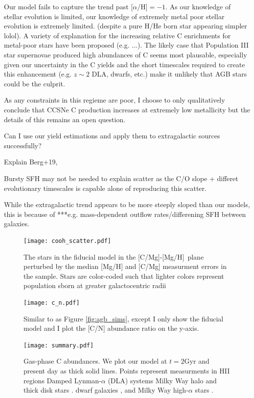\documentclass[12pt,oneside]{report}
\newcommand{\caah}{[C/Mg]-[Mg/H]}
\begin{document}
Our model fails to capture the trend past [$\alpha$/H]$=-1$. As our knowledge
of stellar evolution is limited, our knowledge of extremely metal poor stellar
evolution is extremely limited. (despite a pure H/He born star appearing
simpler lolol). A variety of explanation for the increasing relative C
enrichments for metal-poor stars have been proposed (e.g. ...). The likely case
that Population III star supernovae produced high abundances of C seems
most plausable, especially given our uncertainty in the C yields and the
short timescales required to create this enhancement (e.g. $z\sim 2$ DLA,
dwarfs, etc.) make it unlikely that AGB stars could be the culprit. 

As any constraints in this regieme are poor, I choose to only qualitatively
conclude that CCSNe C production increases at extremely low metallicity
but the details of this remains an open question.


Can I use our yield estimations and apply them to extragalactic sources successfully? 

Explain Berg+19,

Bursty SFH may not be needed to explain scatter as the C/O slope + differet evolutionary timescales is capable alone of reproducing this scatter.

While the extragalactic trend appears to be more steeply sloped than our models, this is because of ***e.g. mass-dependent outflow rates/differening SFH between galaxies. 

\begin{figure}
    \centering
    \texttt{[image: cooh\_scatter.pdf]}
    \caption[Scatter agreement]{The stars in the fiducial model in the \caah~plane perturbed by the median [Mg/H] and [C/Mg] measurment errors in the \citet{jack_subgiant} sample. Stars are color-coded such that lighter colors represent population sborn at greater galactocentric radii
    }
\end{figure}

\begin{figure}
    \texttt{[image: c\_n.pdf]}
    \caption{Similar to as Figure \ref{fig:agb_sims}, except I only show the fiducial model and I plot the [C/N] abundance ratio on the y-axis.
    }
\end{figure}

\begin{figure}
\centering
\texttt{[image: summary.pdf]}
\caption[Gas phase abundances]{Gas-phase C abundances. We plot our model at $t=2$Gyr and present day as thick solid lines. Points represent measurments in 
    HII regions    \citep[pink circles;][]{skillman+20, esteban+02, esteban+09, esteban+14, esteban+19}
    Damped Lynman-$\alpha$ (DLA) systems \citep[blue triangles;][]{cooke+17} 
    Milky Way halo and thick disk stars \citep[green stars;][]{nissen+14, fabbian+09}. 
    dwarf galaxies \citep[red diamonds;]{berg+19},
    and Milky Way high-$\alpha$ stars \citet[yellow points;][]{jack_subgiant}.
}
\label{fig:gas_phase}
\end{figure}
\end{document}
